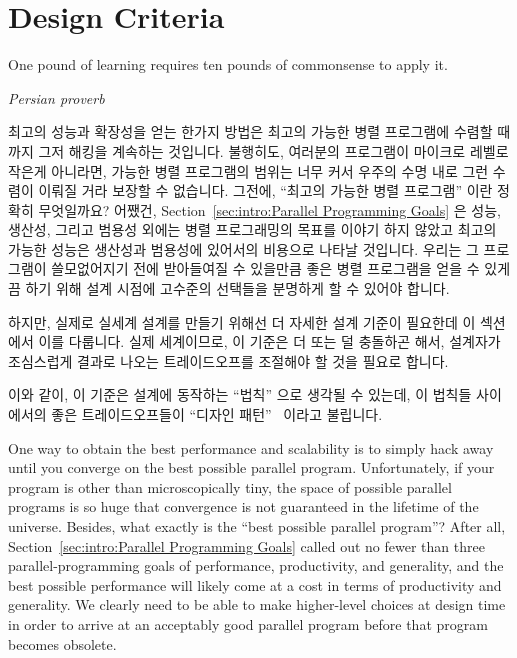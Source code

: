 
\section{Design Criteria}
\label{sec:SMPdesign:Design Criteria}
%
\epigraph{One pound of learning requires ten pounds of commonsense to apply it.}
	 {\emph{Persian proverb}}

최고의 성능과 확장성을 얻는 한가지 방법은 최고의 가능한 병렬 프로그램에 수렴할
때까지 그저 해킹을 계속하는 것입니다.
불행히도, 여러분의 프로그램이 마이크로 레벨로 작은게 아니라면, 가능한 병렬
프로그램의 범위는 너무 커서 우주의 수명 내로 그런 수렴이 이뤄질 거라 보장할 수
없습니다.
그전에, ``최고의 가능한 병렬 프로그램'' 이란 정확히 무엇일까요?
어쨌건, Section~\ref{sec:intro:Parallel Programming Goals}
은 성능, 생산성, 그리고 범용성 외에는 병렬 프로그래밍의 목표를 이야기 하지
않았고 최고의 가능한 성능은 생산성과 범용성에 있어서의 비용으로 나타날
것입니다.
우리는 그 프로그램이 쓸모없어지기 전에 받아들여질 수 있을만큼 좋은 병렬
프로그램을 얻을 수 있게끔 하기 위해 설계 시점에 고수준의 선택들을 분명하게 할
수 있어야 합니다.

하지만, 실제로 실세계 설계를 만들기 위해선 더 자세한 설계 기준이 필요한데 이
섹션에서 이를 다룹니다.
실제 세계이므로, 이 기준은 더 또는 덜 충돌하곤 해서, 설계자가 조심스럽게 결과로
나오는 트레이드오프를 조절해야 할 것을 필요로 합니다.

이와 같이, 이 기준은 설계에 동작하는 ``법칙'' 으로 생각될 수 있는데, 이 법칙들
사이에서의 좋은 트레이드오프들이 ``디자인 패턴''~\cite{Alexander79,GOF95}
이라고 불립니다.

\iffalse

One way to obtain the best performance and scalability is to simply
hack away until you converge on the best possible parallel program.
Unfortunately, if your program is other than microscopically tiny,
the space of possible parallel programs is so huge
that convergence is not guaranteed in the lifetime of the universe.
Besides, what exactly is the ``best possible parallel program''?
After all, Section~\ref{sec:intro:Parallel Programming Goals}
called out no fewer than three parallel-programming goals of
performance, productivity, and generality,
and the best possible performance will likely come at a cost in
terms of productivity and generality.
We clearly need to be able to make higher-level choices at design
time in order to arrive at an acceptably good parallel program
before that program becomes obsolete.


